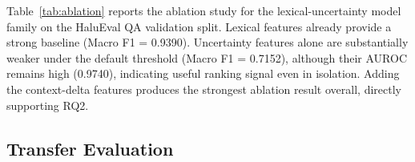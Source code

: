 \documentclass[conference]{IEEEtran}
\begin{document}
Table~\ref{tab:ablation} reports the ablation study for the lexical-uncertainty model family on the HaluEval QA validation split. Lexical features already provide a strong baseline (Macro F1 = 0.9390). Uncertainty features alone are substantially weaker under the default threshold (Macro F1 = 0.7152), although their AUROC remains high (0.9740), indicating useful ranking signal even in isolation. Adding the context-delta features produces the strongest ablation result overall, directly supporting RQ2.

\begin{table}[t]
  \centering
  \caption{Ablation study on the HaluEval QA validation split.}
  \label{tab:ablation}
  \renewcommand{\arraystretch}{1.1}
\end{table}

\subsection{Transfer Evaluation}
\end{document}
